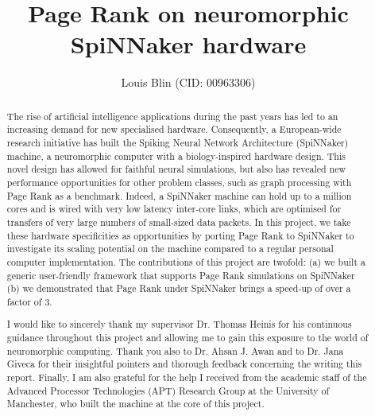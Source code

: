 \documentclass[12pt, twoside]{article}
\title{Page Rank on neuromorphic \\SpiNNaker hardware}
\author{Louis Blin (CID: 00963306)}
\begin{document}


\newpage
\begin{abstract}

The rise of artificial intelligence applications during the past years has led to an increasing demand for new specialised hardware. Consequently, a European-wide research initiative has built the Spiking Neural Network Architecture (SpiNNaker) machine, a neuromorphic computer with a biology-inspired hardware design. This novel design has allowed for faithful neural simulations, but also has revealed new performance opportunities for other problem classes, such as graph processing with Page Rank as a benchmark. Indeed, a SpiNNaker machine can hold up to a million cores and is wired with very low latency inter-core links, which are optimised for transfers of very large numbers of small-sized data packets. In this project, we take these hardware specificities as opportunities by porting Page Rank to SpiNNaker to investigate its scaling potential on the machine compared to a regular personal computer implementation. The contributions of this project are twofold: (a) we built a generic user-friendly framework that supports Page Rank simulations on SpiNNaker (b) we demonstrated that Page Rank under SpiNNaker brings a speed-up of over a factor of 3.

\end{abstract}



\newpage
\renewcommand{\abstractname}{Acknowledgements}
\begin{abstract}

I would like to sincerely thank my supervisor Dr. Thomas Heinis for his continuous guidance throughout this project and allowing me to gain this exposure to the world of neuromorphic computing. Thank you also to Dr. Ahsan J. Awan and to Dr. Jana Giveca for their insightful pointers and thorough feedback concerning the writing this report. Finally, I am also grateful for the help I received from the academic staff of the Advanced Processor Technologies (APT) Research Group at the University of Manchester, who built the machine at the core of this project.

\end{abstract}

\newpage
\tableofcontents

\newpage

\newpage

\newpage

\newpage

\newpage

\newpage


\newpage
%
%


\end{document}
